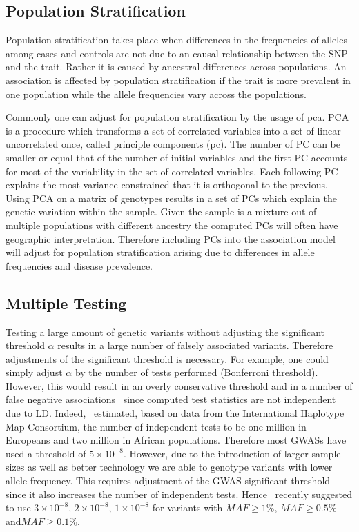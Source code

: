 \documentclass[../header.tex]{subfiles}
\begin{document}
\subsection{Population Stratification}
\label{ssec:population_stratification}

Population stratification takes place when differences in the frequencies of alleles among cases and controls are not due to an causal relationship between the SNP and the trait.
Rather it is caused by ancestral differences across populations.
An association is affected by population stratification if the trait is more prevalent in one population while the allele frequencies vary across the populations.

Commonly one can adjust for population stratification by the usage of \acrfull{pca}.
PCA is a procedure which transforms a set of correlated variables into a set of linear uncorrelated once, called principle components (\acrshort{pc}).
The number of PC can be smaller or equal that of the number of initial variables and the first PC accounts for most of the variability in the set of correlated variables.
Each following PC explains the most variance constrained that it is orthogonal to the previous.
Using PCA on a matrix of genotypes results in a set of PCs which explain the genetic variation within the sample.
Given the sample is a mixture out of multiple populations with different ancestry the computed PCs will often have geographic interpretation.
Therefore including PCs into the association model will adjust for population stratification arising due to differences in allele frequencies and disease prevalence.

\subsection{Multiple Testing}
\label{ssec:multiple_testing}

Testing a large amount of genetic variants without adjusting the significant threshold $\alpha$ results in a large number of falsely associated variants.
Therefore adjustments of the significant threshold is necessary.
For example, one could simply adjust $\alpha$ by the number of tests performed (Bonferroni threshold).
However, this would result in an overly conservative threshold and in a number of false negative associations~\cite{Benjamini1995} since computed test statistics are not independent due to LD\@.
Indeed,~\citet{Peer2008} estimated, based on data from the International Haplotype Map Consortium, the number of independent tests to be one million in Europeans and two million in African populations.
Therefore most GWASs have used a threshold of $5\times 10^{-8}$.
However, due to the introduction of larger sample sizes as well as better technology we are able to genotype variants with lower allele frequency.
This requires adjustment of the GWAS significant threshold since it also increases the number of independent tests.
Hence~\citet{Fadista2016} recently suggested to use $3\times10^{-8}$, $2\times10^{-8}$, $1\times10^{-8}$ for variants with $MAF\ge1\%$, $MAF\ge0.5\%$ and$ MAF\ge0.1\%$.
\end{document}
